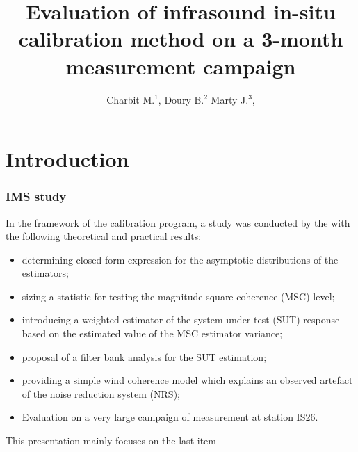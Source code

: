 \documentclass[handout,10pt]{beamer}
\title{Evaluation of infrasound in-situ calibration method on a 3-month measurement campaign}
\author{
 Charbit M.$^{1}$, 
 Doury B.$^{2}$
 Marty J.$^{3}$,
}
\begin{document}
 \sloppy

\begin{frame}
\maketitle
\end{frame}


 \section{Introduction}
\begin{frame}
 \frametitle{IMS study}
 In the framework of the calibration program, a study was  conducted by the 
 with the following theoretical and practical results:
 \begin{itemize}
 \item
 determining closed form expression for the asymptotic distributions of the estimators;
 \item
sizing a statistic for testing  the magnitude square coherence (MSC) level;
 \item
 introducing a weighted estimator of the system under test (SUT) response based on the estimated value of the MSC estimator variance;
 \item
 proposal of a filter bank analysis for the SUT estimation;
 \item
 providing a simple wind coherence model which explains an observed artefact of the noise reduction system (NRS);
 \item
{\color{red} Evaluation on a very large campaign of measurement at station IS26}.
 \end{itemize}
 
  \bigskip
  
This presentation mainly focuses on the last item
 
\end{frame}
\end{document}
